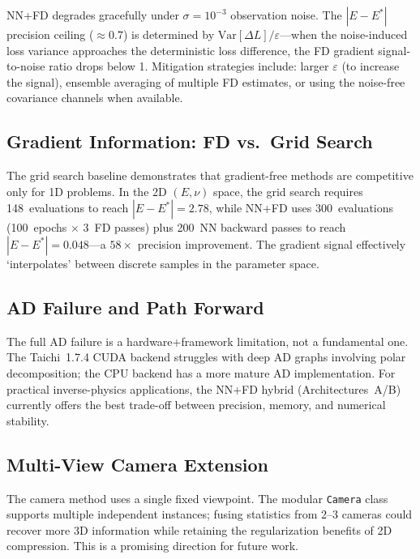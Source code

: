 \documentclass{article}
\begin{document}
NN+FD degrades gracefully under $\sigma=10^{-3}$ observation noise.  The
$|E-E^*|$ precision ceiling ($\approx0.7$) is determined by
$\text{Var}[\Delta L]/\varepsilon$---when the noise-induced loss variance
approaches the deterministic loss difference, the FD gradient signal-to-noise
ratio drops below 1.  Mitigation strategies include: larger $\varepsilon$
(to increase the signal), ensemble averaging of multiple FD estimates, or
using the noise-free covariance channels when available.

\subsection{Gradient Information: FD vs.\ Grid Search}

The grid search baseline demonstrates that gradient-free methods are
competitive only for 1D problems.  In the 2D $(E,\nu)$ space, the grid
search requires 148~evaluations to reach $|E-E^*|=2.78$, while NN+FD
uses 300~evaluations (100~epochs $\times$ 3~FD passes) plus 200~NN
backward passes to reach $|E-E^*|=0.048$---a $58\times$ precision
improvement.  The gradient signal effectively `interpolates' between
discrete samples in the parameter space.

\subsection{AD Failure and Path Forward}

The full AD failure is a hardware+framework limitation, not a
fundamental one.  The Taichi~1.7.4 CUDA backend struggles with deep AD
graphs involving polar decomposition; the CPU backend has a more mature
AD implementation.  For practical inverse-physics applications, the
NN+FD hybrid (Architectures~A/B) currently offers the best trade-off
between precision, memory, and numerical stability.

\subsection{Multi-View Camera Extension}

The camera method uses a single fixed viewpoint.  The modular
\texttt{Camera} class supports multiple independent instances; fusing
statistics from 2--3 cameras could recover more 3D information while
retaining the regularization benefits of 2D compression.  This is a
promising direction for future work.


\end{document}
